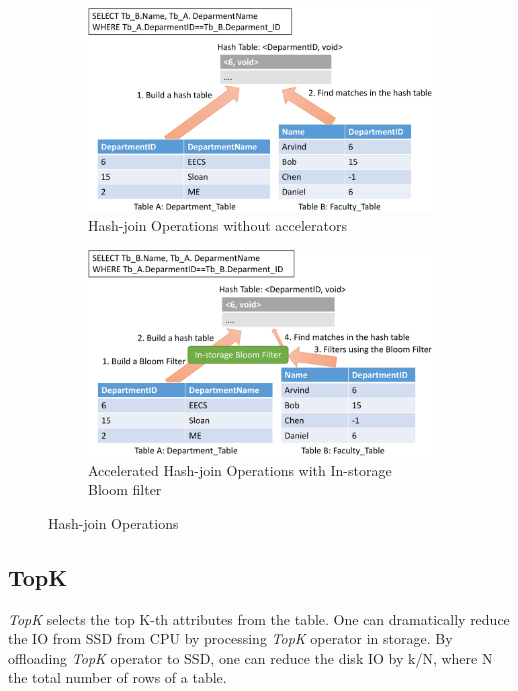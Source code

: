 \documentclass{article}
\newcommand{\topk}{\textit{TopK}\xspace}
\begin{document}
\begin{figure}[!htb]
  \centering
  \begin{subfigure}[t]{0.48\textwidth}
    \includegraphics[width=\textwidth]{figures/hash-join-crop.pdf}
      \caption{Hash-join Operations without accelerators}
      \label{fig:hash-join}
  \end{subfigure}
  \begin{subfigure}[t]{0.48\textwidth}
    \includegraphics[width=\textwidth]{figures/filter-hash-join-crop.pdf}
    \caption{Accelerated Hash-join Operations with In-storage Bloom filter}
    \label{fig:filter-hash-join}
  \end{subfigure}
  \label{fig:try}
  \caption{Hash-join Operations}
\end{figure}

\subsection{TopK}

\topk selects the top K-th attributes from the table.
One can dramatically reduce the IO from SSD from CPU by processing \topk operator in storage.
By offloading \topk operator to SSD, one can reduce the disk IO by k/N, where N the total number of rows of a table.
\end{document}
